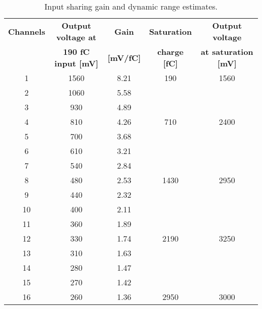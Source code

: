 \documentclass[../main/thesis.tex]{subfiles}
\begin{document}
\begin{table}[h!]
	\begin{center}
		\caption{Input sharing gain and dynamic range estimates.}
		\label{tab-input-share}
		\begin{tabular}{ccccc}\toprule
			\textbf{Channels} & \textbf{Output voltage at} & \textbf{Gain}     & \textbf{Saturation} & \textbf{Output voltage} \\
			& \textbf{190 fC input [mV]} & \textbf{[mV/fC]} & \textbf{charge [fC]} & \textbf{at saturation [mV]} \\\midrule
			1          & 1560                             & 8.21 & 190                  & 1560                            \\
			2          & 1060                             & 5.58 &                      &                                 \\
			3          & 930                              & 4.89 &                      &                                 \\
			4          & 810                              & 4.26 & 710                  & 2400                            \\
			5          & 700                              & 3.68 &                      &                                 \\
			6          & 610                              & 3.21 &                      &                                 \\
			7          & 540                              & 2.84 &                      &                                 \\
			8          & 480                              & 2.53 & 1430                 & 2950                            \\
			9          & 440                              & 2.32 &                      &                                 \\
			10         & 400                              & 2.11 &                      &                                 \\
			11         & 360                              & 1.89 &                      &                                 \\
			12         & 330                              & 1.74 & 2190                 & 3250                            \\
			13         & 310                              & 1.63 &                      &                                 \\
			14         & 280                              & 1.47 &                      &                                 \\
			15         & 270                              & 1.42 &                      &                                 \\
			16         & 260                              & 1.36 & 2950                 & 3000                              \\ \bottomrule
		\end{tabular}
	\end{center}
\end{table}
\end{document}
